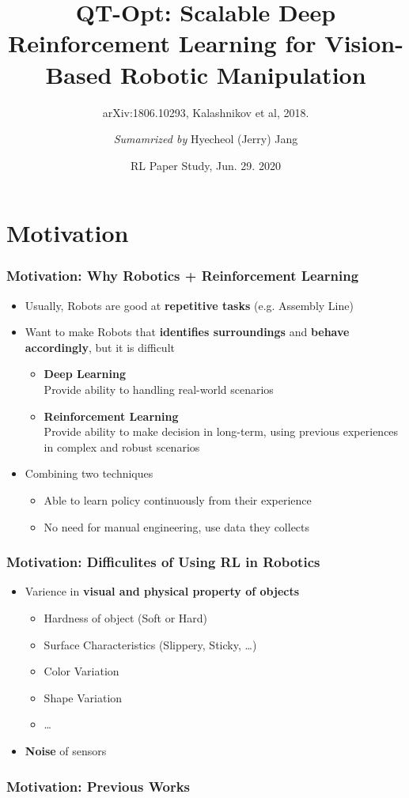 \documentclass{beamer}
\title{QT-Opt: Scalable Deep Reinforcement Learning for Vision-Based Robotic Manipulation}
\subtitle{arXiv:1806.10293, Kalashnikov et al, 2018.}
\author{\textit{Sumamrized by} Hyecheol (Jerry) Jang}
\institute{
  Department of Computer Sciences\\
  University of Wisconsin–Madison
}
\date{RL Paper Study, Jun. 29. 2020}
\newcommand{\firstSec}{Motivation}
\begin{document}
  \frame{\titlepage}

  \section{\firstSec}
    \begin{frame}
      \frametitle{\firstSec : Why Robotics + Reinforcement Learning}
      \begin{itemize}
        \item Usually, Robots are good at \textbf{repetitive tasks} (e.g. Assembly Line)
              \pause
        \item Want to make Robots that \textbf{identifies surroundings} and \textbf{behave accordingly},
              but it is difficult
              \pause
        \begin{itemize}
          \item \textbf{Deep Learning}\\
                Provide ability to handling real-world scenarios
          \item \textbf{Reinforcement Learning}\\
                Provide ability to make decision in long-term,
                using previous experiences in complex and robust scenarios
        \end{itemize}
        \pause
        \item Combining two techniques
        \begin{itemize}
          \item Able to learn policy continuously from their experience
          \item No need for manual engineering, use data they collects
        \end{itemize}
      \end{itemize}
    \end{frame}

    \begin{frame}
      \frametitle{\firstSec : Difficulites of Using RL in Robotics}
      \begin{itemize}
        \item Varience in \textbf{visual and physical property of objects}
        \pause
        \begin{itemize}
          \item Hardness of object (Soft or Hard)
          \item Surface Characteristics (Slippery, Sticky, \ldots)
          \item Color Variation
          \item Shape Variation
          \item \ldots
        \end{itemize}
        \pause
        \item \textbf{Noise} of sensors
      \end{itemize}
    \end{frame}

    \begin{frame}
      \frametitle{\firstSec : Previous Works}
    \end{frame}
\end{document}
